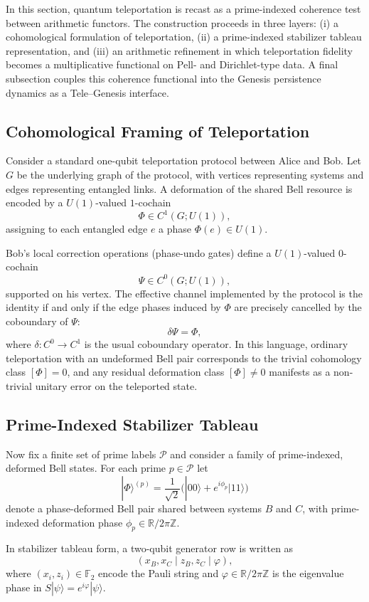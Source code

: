 \documentclass[11pt]{article}
\begin{document}
In this section, quantum teleportation is recast as a prime-indexed coherence test between arithmetic functors. The construction proceeds in three layers: (i) a cohomological formulation of teleportation, (ii) a prime-indexed stabilizer tableau representation, and (iii) an arithmetic refinement in which teleportation fidelity becomes a multiplicative functional on Pell- and Dirichlet-type data. A final subsection couples this coherence functional into the Genesis persistence dynamics as a Tele--Genesis interface.

\subsection{Cohomological Framing of Teleportation}

Consider a standard one-qubit teleportation protocol between Alice and Bob. Let $G$ be the underlying graph of the protocol, with vertices representing systems and edges representing entangled links. A deformation of the shared Bell resource is encoded by a $U(1)$-valued $1$-cochain
\[
\Phi \in C^{1}(G;U(1)),
\]
assigning to each entangled edge $e$ a phase $\Phi(e) \in U(1)$.

Bob's local correction operations (phase-undo gates) define a $U(1)$-valued $0$-cochain
\[
\Psi \in C^{0}(G;U(1)),
\]
supported on his vertex. The effective channel implemented by the protocol is the identity if and only if the edge phases induced by $\Phi$ are precisely cancelled by the coboundary of $\Psi$:
\[
\delta \Psi = \Phi,
\]
where $\delta: C^{0} \to C^{1}$ is the usual coboundary operator. In this language, ordinary teleportation with an undeformed Bell pair corresponds to the trivial cohomology class $[\Phi]=0$, and any residual deformation class $[\Phi] \neq 0$ manifests as a non-trivial unitary error on the teleported state.

\subsection{Prime-Indexed Stabilizer Tableau}

Now fix a finite set of prime labels $\mathcal{P}$ and consider a family of prime-indexed, deformed Bell states. For each prime $p \in \mathcal{P}$ let
\[
|\Phi\rangle^{(p)} = \frac{1}{\sqrt{2}}\bigl(|00\rangle + e^{i\phi_p}|11\rangle\bigr)
\]
denote a phase-deformed Bell pair shared between systems $B$ and $C$, with prime-indexed deformation phase $\phi_p \in \mathbb{R}/2\pi\mathbb{Z}$.

In stabilizer tableau form, a two-qubit generator row is written as
\[
(x_B,x_C \mid z_B,z_C \mid \varphi),
\]
where $(x_i,z_i)\in\mathbb{F}_2$ encode the Pauli string and $\varphi\in\mathbb{R}/2\pi\mathbb{Z}$ is the eigenvalue phase in $S|\psi\rangle = e^{i\varphi}|\psi\rangle$.
\end{document}
